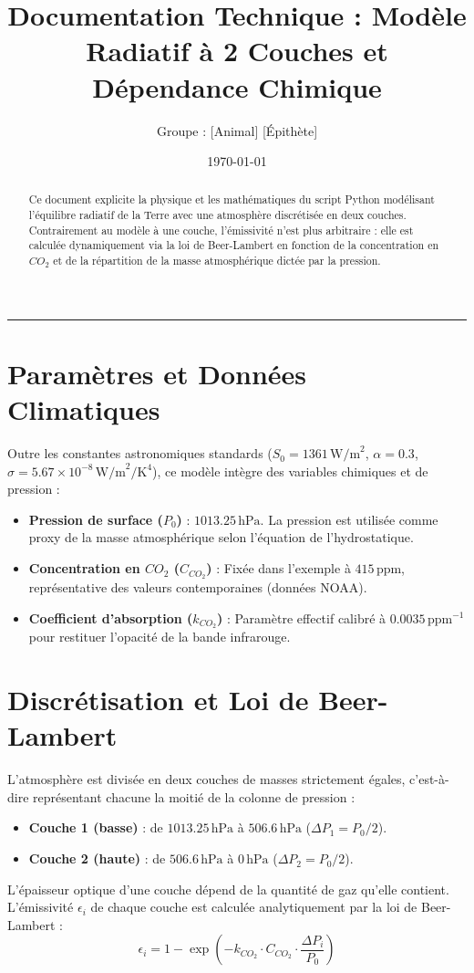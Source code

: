 \documentclass[11pt,a4paper]{article}
\title{Documentation Technique : Modèle Radiatif à 2 Couches et Dépendance Chimique}
\author{Groupe : [Animal] [Épithète]}
\date{\today}
\begin{document}
\maketitle

\begin{abstract}
Ce document explicite la physique et les mathématiques du script Python modélisant l'équilibre radiatif de la Terre avec une atmosphère discrétisée en deux couches. Contrairement au modèle à une couche, l'émissivité n'est plus arbitraire : elle est calculée dynamiquement via la loi de Beer-Lambert en fonction de la concentration en $CO_2$ et de la répartition de la masse atmosphérique dictée par la pression.
\end{abstract}

\vspace{0.5cm}
\hrule
\vspace{0.5cm}

\section{Paramètres et Données Climatiques}
Outre les constantes astronomiques standards ($S_0 = 1361 \, \text{W/m}^2$, $\alpha = 0.3$, $\sigma = 5.67 \times 10^{-8} \, \text{W/m}^2/\text{K}^4$), ce modèle intègre des variables chimiques et de pression :
\begin{itemize}
    \item \textbf{Pression de surface ($P_0$)} : $1013.25 \, \text{hPa}$. La pression est utilisée comme proxy de la masse atmosphérique selon l'équation de l'hydrostatique.
    \item \textbf{Concentration en $CO_2$ ($C_{CO_2}$)} : Fixée dans l'exemple à $415 \, \text{ppm}$, représentative des valeurs contemporaines (données NOAA).
    \item \textbf{Coefficient d'absorption ($k_{CO_2}$)} : Paramètre effectif calibré à $0.0035 \, \text{ppm}^{-1}$ pour restituer l'opacité de la bande infrarouge.
\end{itemize}

\section{Discrétisation et Loi de Beer-Lambert}
L'atmosphère est divisée en deux couches de masses strictement égales, c'est-à-dire représentant chacune la moitié de la colonne de pression :
\begin{itemize}
    \item \textbf{Couche 1 (basse)} : de $1013.25 \, \text{hPa}$ à $506.6 \, \text{hPa}$ ($\Delta P_1 = P_0 / 2$).
    \item \textbf{Couche 2 (haute)} : de $506.6 \, \text{hPa}$ à $0 \, \text{hPa}$ ($\Delta P_2 = P_0 / 2$).
\end{itemize}
L'épaisseur optique d'une couche dépend de la quantité de gaz qu'elle contient. L'émissivité $\epsilon_i$ de chaque couche est calculée analytiquement par la loi de Beer-Lambert :
\begin{equation}
    \epsilon_i = 1 - \exp\left(-k_{CO_2} \cdot C_{CO_2} \cdot \frac{\Delta P_i}{P_0}\right)
\end{equation}
\end{document}
